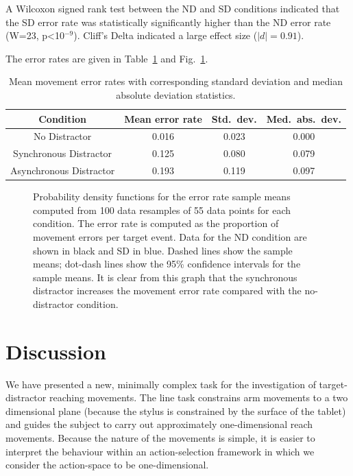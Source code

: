 \documentclass[10pt,letterpaper]{article}
\begin{document}
A Wilcoxon signed
rank test between the ND and SD conditions indicated that the SD error
rate was statistically significantly higher than the ND error rate
(W=23, p\textless10$^{-9}$). Cliff's Delta indicated a large effect
size ($|d|=0.91$).

The error rates are given in Table~\ref{table:error_rates} and
Fig.~\ref{bootstrap_errors}.

\begin{table}[ht]
\caption{Mean movement error rates with corresponding standard
  deviation and median absolute deviation statistics.}
\centering
\begin{tabular}{c c c c}
\hline
\textbf{Condition} & \textbf{Mean error rate} & \textbf{Std.~dev.} & \textbf{Med.~abs.~dev.} \\ [0.5ex]
\hline
No Distractor & 0.016 & 0.023 & 0.000 \\
Synchronous Distractor & 0.125 & 0.080 & 0.079 \\
Asynchronous Distractor & 0.193 & 0.119 & 0.097 \\ [1ex]
\hline
\end{tabular}
\label{table:error_rates}
\end{table}

\begin{figure}[htb!]
\centering
\caption[Bootstrapped error PDFS] {Probability density functions for
  the error rate sample means computed from 100 data resamples of 55
  data points for each condition. The error rate is computed as the
  proportion of movement errors per target event. Data for the ND
  condition are shown in black and SD in blue. Dashed lines show the
  sample means; dot-dash lines show the 95\% confidence intervals for
  the sample means. It is clear from this graph that
  the synchronous distractor increases the movement error rate
  compared with the no-distractor condition.}
\label{bootstrap_errors}
\end{figure}

\section*{Discussion}

We have presented a new, minimally complex task for the investigation
of target-distractor reaching movements.  The line task constrains arm
movements to a two dimensional plane (because the stylus is
constrained by the surface of the tablet) and guides the subject to
carry out approximately one-dimensional reach movements. Because the
nature of the movements is simple, it is easier to interpret the
behaviour within an action-selection framework in which we consider
the action-space to be one-dimensional.
\end{document}
